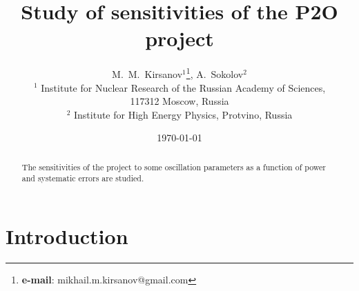 \documentclass[prd,showpacs,groupedaddress,superscriptaddress,amsmath,amssymb]{revtex4-2} %
\begin{document}


\title{ \bf Study of sensitivities of the P2O project}


\author{M.~M.~Kirsanov$^{1}$\thanks{{\bf e-mail}: mikhail.m.kirsanov@gmail.com}, A.~Sokolov$^{2}$
\\
 $^1$ Institute for Nuclear Research of the Russian Academy of Sciences, \\117312 Moscow, Russia \\
 $^2$ Institute for High Energy Physics, Protvino, Russia \\
}




%


\date{\today}%



\begin{abstract}
The sensitivities of the project to some oscillation parameters as a function of power and systematic errors are studied.
\end{abstract}


\maketitle
\newpage


\section{Introduction}
\end{document}

